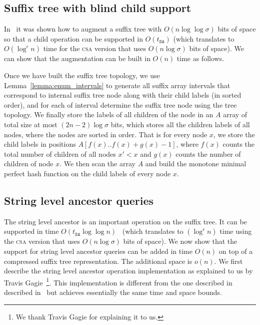 \documentclass[a4paper]{article}
\begin{document}
\subsection{Suffix tree with blind child support}
\label{sec:build_blind_child_support}
In~\cite{BN11,BNtalg14} it was shown how to augment a suffix tree with $O(n\log\log\sigma)$
bits of space so that a child operation can be supported in $O(t_{\mathtt{SA}})$ (which translates 
to $O(\log^\epsilon n)$ time for the \textsc{csa} version that uses $O(n\log\sigma)$ bits of space). 
We can show that the augmentation can be built in $O(n)$ time as follows. 

Once we have built the suffix tree topology, we use Lemma~\ref{lemma:enum_intervals} to 
generate all suffix array intervals that correspond to internal suffix tree node along with
their child labels (in sorted order), and for each of interval
determine the suffix tree node using the tree topology. 
We finally store the labels of all children of the node 
in an $A$ array of total size at most $(2n-2)\log\sigma$ bits, which stores all the children labels
of all nodes, where the nodes are sorted in order. That is for every node $x$, we store 
the child labels in positions $A[f(x)..f(x)+g(x)-1]$, where $f(x)$ counts the total number of children of all 
nodes $x'<x$ and $g(x)$ counts the number of children of node $x$. We then scan the array $A$ and 
build the monotone minimal perfect hash function on the child labels of every node $x$. 

\subsection{String level ancestor queries}
\label{sec:build_blind_child_support}

The string level ancestor is an important operation on the suffix tree. It can be supported in time $O(t_{\mathtt{SA}}\log\log n)$~\cite{KKNS13} (which translates to $(\log^\epsilon n)$ time using the \textsc{csa} version that uses $O(n\log\sigma)$ bits of space). 
We now show that the support for string level ancestor queries can be added in time $O(n)$ on top of a compressed suffix tree representation. The additional space is $o(n)$. 
We first describe the string level ancestor operation implementation as explained to us by Travis Gagie~\footnote{We thank Travis Gagie for explaining it to us.}. This implementation is different from the one described in described in~\cite{KKNS13} but achieves essentially the same time and space bounds. 
\end{document}
